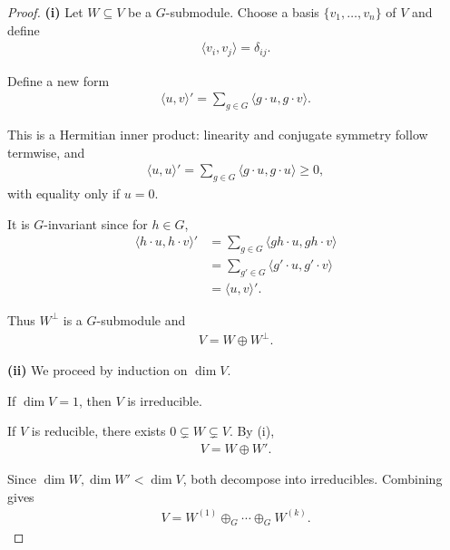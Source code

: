 \documentclass[titlepage]{article}
\theoremstyle{plain}
\theoremstyle{definition}
\theoremstyle{remark}
\theoremstyle{exercise-style}
\numberwithin{equation}{section}
\numberwithin{theorem}{section}
\numberwithin{remark}{section}
\begin{document}
\begin{proof}
    \medskip
    
    \textbf{(i)} Let $W \subseteq V$ be a $G$-submodule. Choose a basis $\{v_1,\dots,v_n\}$ of $V$ and define
    \begin{align}
        \langle v_i, v_j \rangle = \delta_{ij}.
    \end{align}
    
    Define a new form
    \begin{align}
        \langle u, v \rangle' = \sum_{g \in G} \langle g \cdot u, g \cdot v \rangle.
    \end{align}
    
    This is a Hermitian inner product: linearity and conjugate symmetry follow termwise, and
    \begin{align}
        \langle u, u \rangle' = \sum_{g \in G} \langle g \cdot u, g \cdot u \rangle \ge 0,
    \end{align}
    with equality only if $u = 0$.
    
    It is $G$-invariant since for $h \in G$,
    \begin{align}
        \langle h \cdot u, h \cdot v \rangle'
        &= \sum_{g \in G} \langle g h \cdot u, g h \cdot v \rangle \\
        &= \sum_{g' \in G} \langle g' \cdot u, g' \cdot v \rangle \\
        &= \langle u, v \rangle'.
    \end{align}
    
    Thus $W^\perp$ is a $G$-submodule and
    \begin{align}
        V = W \oplus W^\perp.
    \end{align}
    
    \medskip
    
    \textbf{(ii)} We proceed by induction on $\dim V$.
    
    If $\dim V = 1$, then $V$ is irreducible.
    
    If $V$ is reducible, there exists $0 \subsetneq W \subsetneq V$. By (i),
    \begin{align}
        V = W \oplus W'.
    \end{align}
    
    Since $\dim W, \dim W' < \dim V$, both decompose into irreducibles. Combining gives
    \begin{align}
        V = W^{(1)} \oplus_G \cdots \oplus_G W^{(k)}.
    \end{align}
\end{proof}
\end{document}
